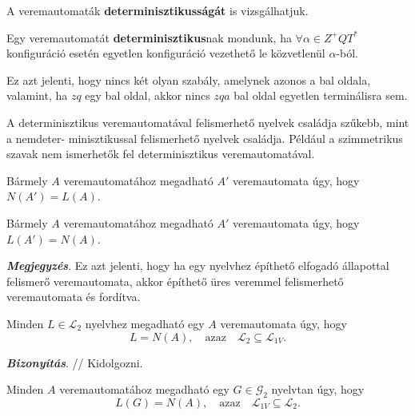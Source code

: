 A veremautomaták \textbf{determinisztikusságát} is vizsgálhatjuk.

\begin{tcolorbox}
	\begin{definition}
		Egy veremautomatát \textbf{determinisztikus}nak mondunk, ha
		$\forall \alpha \in Z^+QT^*$ konfiguráció esetén egyetlen
		konfiguráció vezethető le közvetlenül $\alpha$-ból.
	\end{definition}
\end{tcolorbox}

Ez azt jelenti, hogy nincs két olyan szabály, amelynek azonos a
bal oldala, valamint, ha $zq$ egy bal oldal, akkor nincs $zqa$ bal oldal egyetlen
terminálisra sem.

A determinisztikus veremautomatával felismerhető nyelvek családja szűkebb, mint a nemdeter-
minisztikussal felismerhető nyelvek családja. Például a szimmetrikus szavak nem ismerhetők fel
determinisztikus veremautomatával.

\begin{tcolorbox}
	\begin{lemma}
		Bármely $A$ veremautomatához megadható $A'$
		veremautomata úgy, hogy $N(A')=L(A)$.
	\end{lemma}
\end{tcolorbox}

\begin{tcolorbox}
	\begin{lemma}
		Bármely $A$ veremautomatához megadható $A'$
		veremautomata úgy, hogy $L(A')=N(A)$.
	\end{lemma}
\end{tcolorbox}

\textbf{\textit{Megjegyzés}}. Ez azt jelenti, hogy ha egy nyelvhez építhető elfogadó
állapottal felismerő veremautomata, akkor építhető üres veremmel felismerhető
veremautomata és fordítva.

\begin{tcolorbox}
	\begin{theorem}
		Minden $L \in \mathcal{L}_2$ nyelvhez megadható egy $A$ veremautomata
		úgy, hogy
		\[ L = N(A), \text{ ~ azaz ~ } \mathcal{L}_2 \subseteq \mathcal{L}_{1V}. \]
	\end{theorem}
\end{tcolorbox}

\textbf{\textit{Bizonyítás}}. // Kidolgozni.

\begin{tcolorbox}
	\begin{theorem}
		Minden $A$ veremautomatához megadható egy
		$G \in \mathcal{G}_2$ nyelvtan úgy, hogy
		\[ L(G) = N(A), \text{ ~ azaz ~ } \mathcal{L}_{1V} \subseteq \mathcal{L}_{2}. \]
	\end{theorem}
\end{tcolorbox}

